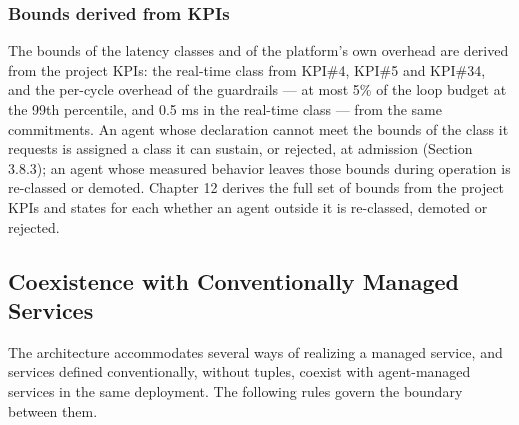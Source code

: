 \hypertarget{bounds-derived-from-kpis}{%
\subsubsection{Bounds derived from KPIs}\label{bounds-derived-from-kpis}}

The bounds of the latency classes and of the platform's own overhead are
derived from the project KPIs: the real-time class from KPI\#4, KPI\#5
and KPI\#34, and the per-cycle overhead of the guardrails --- at most
5\% of the loop budget at the 99th percentile, and 0.5 ms in the
real-time class --- from the same commitments. An agent whose
declaration cannot meet the bounds of the class it requests is assigned
a class it can sustain, or rejected, at admission (Section 3.8.3); an
agent whose measured behavior leaves those bounds during operation is
re-classed or demoted. Chapter 12 derives the full set of bounds from
the project KPIs and states for each whether an agent outside it is
re-classed, demoted or rejected.

\hypertarget{coexistence-with-conventionally-managed-services}{%
\subsection{Coexistence with Conventionally Managed Services}\label{coexistence-with-conventionally-managed-services}}

The architecture accommodates several ways of realizing a managed
service, and services defined conventionally, without tuples, coexist
with agent-managed services in the same deployment. The following rules
govern the boundary between them.


